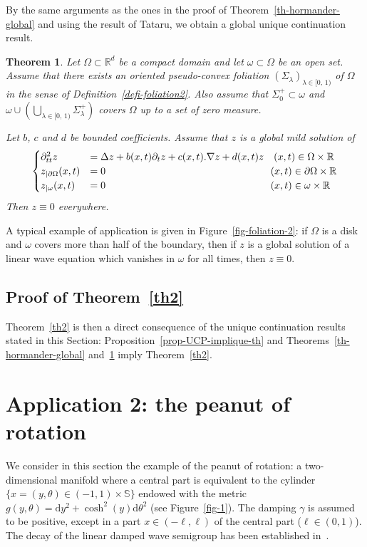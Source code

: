 \documentclass[10pt]{amsart}
\newtheorem{theo}{Theorem}[section]
\theoremstyle{definition}\newtheorem{defi}[theo]{Definition}\newtheorem{rema}[theo]{Remark}\newtheorem{exam}[theo]{Example}\newtheorem{exem}[theo]{Example}\newtheorem{nota}[theo]{Notation}
\newcommand{\RR}{\mathbb{R}}
\renewcommand{\SS}{\mathbb{S}}
\newcommand{\drm}{\mathrm{d}}
\newcommand{\grad}{\nabla}
\begin{document}
By the same arguments as the ones in the proof of Theorem~\ref{th-hormander-global} and using the result of Tataru, we obtain a global unique continuation result.

\begin{theo}\label{th-hormander-global-2}
Let $\Omega\subset\RR^d$ be a compact domain and let $\omega\subset\Omega$ be an open set. Assume that there exists an oriented pseudo-convex foliation $(\Sigma_\lambda)_{\lambda\in[0,\,1)}$ of $\Omega$ in the sense of Definition~\ref{defi-foliation2}. Also assume that $\Sigma_0^+\subset
\omega$ and $\omega\cup\left(\bigcup_{\lambda\in[0,\,1)} \Sigma_\lambda^+\right)$ covers $\Omega$ up to a set of zero measure.

Let $b$, $c$ and $d$ be bounded coefficients. Assume that $z$ is a global mild solution of
\[
\begin{cases}
\partial^2_{tt}z &=\Delta z + b(x,t)\partial_t z+c(x,t).\grad z+d(x,t)z\quad(x,t)\in\Omega\times \RR\\
z_{|\partial\Omega}(x,t)&=0 \mkern298mu (x,t)\in\partial\Omega\times\RR\\
z_{|\omega}(x,t)&=0 \mkern298mu(x,t)\in\omega\times\RR
\end{cases}
\]
Then $z\equiv 0$ everywhere.
\end{theo}

A typical example of application is given in Figure~\ref{fig-foliation-2}: if $\Omega$ is a disk and $\omega$ covers more than half of the boundary, then if $z$ is a global solution of a linear wave equation which vanishes in $\omega$ for all times, then $z\equiv 0$.

\subsection{Proof of Theorem~\ref{th2}}

Theorem~\ref{th2} is then a direct consequence of the unique continuation results stated in this Section: Proposition~\ref{prop-UCP-implique-th} and Theorems~\ref{th-hormander-global} and~\ref{th-hormander-global-2} imply Theorem~\ref{th2}.



\section{Application 2: the peanut of rotation}\label{section-appli2}

We consider in this section the example of the peanut of rotation: a two-dimensional manifold where a central part is equivalent to the cylinder $\{x=(y,\theta)\in (-1,1)\times\!\SS\!\}$ endowed with the metric $g(y,\theta)=\drm y^2+\cosh^2(y)\drm\theta^2$ (see Figure~\ref{fig-1}). The damping $\gamma$ is assumed to be positive, except in a part $x\in (-\ell,\ell)$ of the central part ($\ell\in (0,1)$). The decay of the linear damped wave semigroup has been established in~\cite{CSVW,Schenck}.
\end{document}
